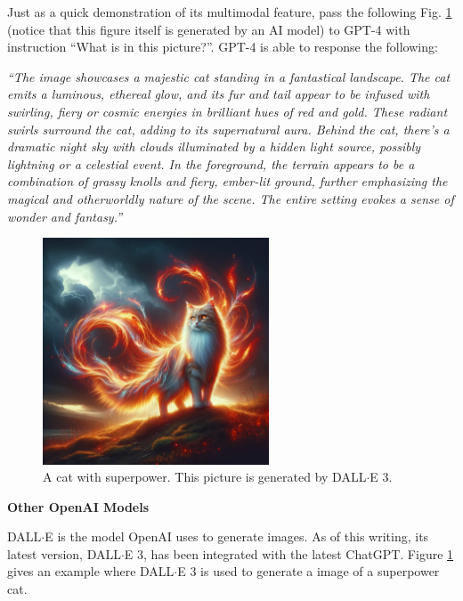 Just as a quick demonstration of its multimodal feature, pass the following Fig. \ref{fig:superpower_cat} (notice that this figure itself is generated by an AI model) to GPT-4 with instruction ``What is in this picture?''. GPT-4 is able to response the following:

\vspace{0.1in}
\noindent \textit{``The image showcases a majestic cat standing in a fantastical landscape. The cat emits a luminous, ethereal glow, and its fur and tail appear to be infused with swirling, fiery or cosmic energies in brilliant hues of red and gold. These radiant swirls surround the cat, adding to its supernatural aura. Behind the cat, there's a dramatic night sky with clouds illuminated by a hidden light source, possibly lightning or a celestial event. In the foreground, the terrain appears to be a combination of grassy knolls and fiery, ember-lit ground, further emphasizing the magical and otherworldly nature of the scene. The entire setting evokes a sense of wonder and fantasy.''}
\vspace{0.1in}

\begin{figure}[!htb]
	\centering
	\includegraphics[width=0.6\textwidth]{./chapters/part-7/figures/superpower_cat.png}
	\caption{A cat with superpower. This picture is generated by DALL$\cdot$E 3.}
	\label{fig:superpower_cat}
\end{figure}

\vspace{0.1in}
\noindent \textbf{Other OpenAI Models}
\vspace{0.1in}

DALL$\cdot$E is the model OpenAI uses to generate images. As of this writing, its latest version, DALL$\cdot$E 3, has been integrated with the latest ChatGPT. Figure \ref{fig:superpower_cat} gives an example where DALL$\cdot$E 3 is used to generate a image of a superpower cat.

